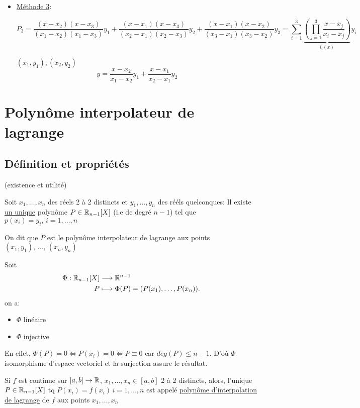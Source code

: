 \begin{eg}
\begin{itemize}
\begin{remark}
\begin{center}
\begin{tabular}{| c | c | c | c |}
                   \hline
                   \end{tabular}
               \end{center}
            \end{remark}
        \item \underline{Méthode 3}:
            \par
            \[
            P_3 = \frac{(x - x_2)(x - x_3)}{(x_1 - x_2)(x_1 - x_3)}y_1 + \frac{(x - x_1)(x - x_3)}{(x_2 - x_1)(x_2 - x_3)}y_2 + \frac{(x - x_1)(x - x_2)}{(x_3 - x_1)(x_3 - x_2)}y_3 = \sum_{i=1}^{3} \underbrace{\left( \prod_{j=1}^{3} \frac{x - x_j}{x_i - x_j}  \right)}_{l_i(x)} y_i
            \] 
            \begin{remark}
               $(x_1, y_1), (x_2, y_2)$ 
               \[
               y = \frac{x - x_2}{x_1 - x_2}y_1 + \frac{x - x_1}{x_2 - x_1}y_2
               \] 
            \end{remark}
   \end{itemize}
\end{eg}
\section{Polynôme interpolateur de lagrange}
\subsection{Définition et propriétés}
\begin{theorem}
    (existence et utilité) \par
    Soit $x_1, \ldots, x_n$ des réels 2 à 2 distincts et $y_1, \ldots, y_n$ des rééls quelconques: Il existe \underline{un unique} polynôme $P \in \mathbb{R}_{n-1}[X]$ (i.e de degré $n-1$) tel que $p(x_i) = y_i, \, i = 1, \ldots, n$
    \par
    On dit que $P$ est le polynôme interpolateur de lagrange aux points  $(x_1, y_1), \, \ldots, \, (x_n, y_n)$
\end{theorem}
\begin{preuve}
   Soit \begin{align*}
       \Phi: \mathbb{R}_{n-1}[X] &\longrightarrow \mathbb{R}^{n-1} \\
       P &\longmapsto \Phi(P) = (P(x_1), \ldots, P(x_n))
   .\end{align*} 
   on a:
   \begin{itemize}
       \item $\Phi$ linéaire
       \item  $\Phi$ injective
   \end{itemize}
   En effet, $\Phi(P) = 0 \iff P(x_i) = 0 \iff P \equiv 0$ car $deg(P) \le n-1$.
   D'où $\Phi$ isomorphisme d'espace vectoriel et la surjection assure le résultat.
\end{preuve}
\begin{definition}
    Si $f$ est continue sur  $[a, b] \to \mathbb{R}$, $x_1, \ldots, x_n \in [a, b]$ 2 à 2 distincts, alors, l'unique $P \in \mathbb{R}_{n-1}[X]$ tq $P(x_i) = f(x_i) \, i = 1, \ldots, n$ est appelé \underline{polynôme d'interpolation de lagrange} de $f$ aux points  $x_1, \ldots, x_n$
\end{definition}
